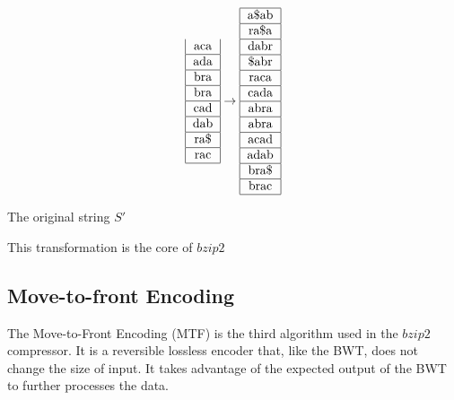 \documentclass{article}
\begin{document}
\begin{equation*}
\begin{tabular}{|c|}
        aca \\ \hline
        ada \\ \hline
        bra \\ \hline
        bra \\ \hline
        cad \\ \hline
        dab \\ \hline
        ra\$ \\ \hline
        rac \\ \hline
    \end{tabular}
    \rightarrow
    \begin{tabular}{|c|}\hline
        a\$ab \\ \hline
        ra\$a \\ \hline
        dabr \\ \hline
        \$abr \\ \hline
        raca \\ \hline
        cada \\ \hline
        abra \\ \hline
        abra \\ \hline
        acad \\ \hline
        adab \\ \hline
        bra\$ \\ \hline
        brac \\ \hline
    \end{tabular}
\end{equation*}


The original string \(S'\)


This transformation is the core of \(bzip2\)

\subsection{Move-to-front Encoding}
The Move-to-Front Encoding (MTF) is the third algorithm used in the \(bzip2\) compressor. It is a reversible lossless encoder that, like the BWT, does not change the size of input. It takes advantage of the expected output of the BWT to further processes the data.
\end{document}
